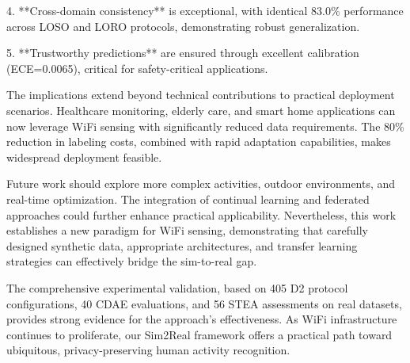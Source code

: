 \documentclass[journal]{IEEEtran}
\begin{document}
4. **Cross-domain consistency** is exceptional, with identical 83.0\% performance across LOSO and LORO protocols, demonstrating robust generalization.

5. **Trustworthy predictions** are ensured through excellent calibration (ECE=0.0065), critical for safety-critical applications.

The implications extend beyond technical contributions to practical deployment scenarios. Healthcare monitoring, elderly care, and smart home applications can now leverage WiFi sensing with significantly reduced data requirements. The 80\% reduction in labeling costs, combined with rapid adaptation capabilities, makes widespread deployment feasible.

Future work should explore more complex activities, outdoor environments, and real-time optimization. The integration of continual learning and federated approaches could further enhance practical applicability. Nevertheless, this work establishes a new paradigm for WiFi sensing, demonstrating that carefully designed synthetic data, appropriate architectures, and transfer learning strategies can effectively bridge the sim-to-real gap.

The comprehensive experimental validation, based on 405 D2 protocol configurations, 40 CDAE evaluations, and 56 STEA assessments on real datasets, provides strong evidence for the approach's effectiveness. As WiFi infrastructure continues to proliferate, our Sim2Real framework offers a practical path toward ubiquitous, privacy-preserving human activity recognition.



\end{document}
